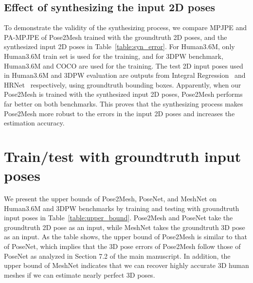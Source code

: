 \documentclass[runningheads]{llncs}
\begin{document}
\subsection{Effect of synthesizing the input 2D poses}
To demonstrate the validity of the synthesizing process, we compare MPJPE and PA-MPJPE of Pose2Mesh trained with the groundtruth 2D poses, and the synthesized input 2D poses in Table~\ref{table:syn_error}.
For Human3.6M, only Human3.6M train set is used for the training, and for 3DPW benchmark, Human3.6M and COCO are used for the training.
The test 2D input poses used in Human3.6M and 3DPW evaluation are outputs from Integral Regression~\cite{sun2018integral} and HRNet~\cite{sun2019deep} respectively, using groundtruth bounding boxes.
Apparently, when our Pose2Mesh is trained with the synthesized input 2D poses, Pose2Mesh performs far better on both benchmarks.
This proves that the synthesizing process makes Pose2Mesh more robust to the errors in the input 2D poses and increases the estimation accuracy.

\begin{table}[!hbt]
\setlength{\tabcolsep}{1pt}
\def\arraystretch{1.1}
\centering
\caption{The MPJPE and PA-MPJPE comparison according to input type in the training stage.}
\label{table:syn_error}
\end{table}

\section{Train/test with groundtruth input poses}
We present the upper bounds of Pose2Mesh, PoseNet, and MeshNet on Human3.6M and 3DPW benchmarks by training and testing with groundtruth input poses in Table~\ref{table:upper_bound}.
Pose2Mesh and PoseNet take the groundtruth 2D pose as an input, while MeshNet takes the groundtruth 3D pose as an input.
As the table shows, the upper bound of Pose2Mesh is similar to that of PoseNet, which implies that the 3D pose errors of Pose2Mesh follow those of PoseNet as analyzed in Section 7.2 of the main manuscript.
In addition, the upper bound of MeshNet indicates that we can recover highly accurate 3D human meshes if we can estimate nearly perfect 3D poses. 
\end{document}
